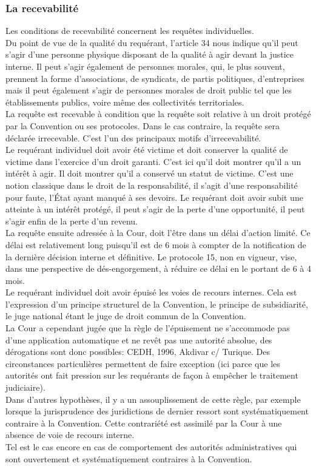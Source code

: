 \documentclass[10pt, a4paper, openany]{book}
\begin{document}
\subsubsection{La recevabilité}

Les conditions de recevabilité concernent les requêtes individuelles. \\
Du point de vue de la qualité du requérant, l'article 34 nous indique qu'il peut s'agir d'une personne physique disposant de la qualité à agir devant la justice interne. Il peut s'agir également de personnes morales, qui, le plus souvent, prennent la forme d'associations, de syndicats, de partis politiques, d'entreprises mais il peut également s'agir de personnes morales de droit public tel que les établissements publics, voire même des collectivités territoriales. \\
La requête est recevable à condition que la requête soit relative à un droit protégé par la Convention ou ses protocoles. Dans le cas contraire, la requête sera déclarée irrecevable. C'est l'un des principaux motifs d'irrecevabilité. \\
Le requérant individuel doit avoir été victime et doit conserver la qualité de victime dans l'exercice d'un droit garanti. C'est ici qu'il doit montrer qu'il a un intérêt à agir. Il doit montrer qu'il a conservé un statut de victime. C'est une notion classique dans le droit de la responsabilité, il s'agit d'une responsabilité pour faute, l'État ayant manqué à ses devoirs. Le requérant doit avoir subit une atteinte à un intérêt protégé, il peut s'agir de la perte d'une opportunité, il peut s'agir enfin de la perte d'un revenu. \\
La requête ensuite adressée à la Cour, doit l'être dans un délai d'action limité. Ce délai est relativement long puisqu'il est de 6 mois à compter de la notification de la dernière décision interne et définitive. Le protocole 15, non en vigueur, vise, dans une perspective de dés-engorgement, à réduire ce délai en le portant de 6 à 4 mois. \\


Le requérant individuel doit avoir épuisé les voies de recours internes. Cela est l'expression d'un principe structurel de la Convention, le principe de subsidiarité, le juge national étant le juge de droit commun de la Convention. \\
La Cour a cependant jugée que la règle de l'épuisement ne s'accommode pas d'une application automatique et ne revêt pas une autorité absolue, des dérogations sont donc possibles: CEDH, 1996, Akdivar c/ Turique. Des circonstances particulières permettent de faire exception (ici parce que les autorités ont fait pression sur les requérants de façon à empêcher le traitement judiciaire).\\
Dans d'autres hypothèses, il y a un assouplissement de cette règle, par exemple lorsque la jurisprudence des juridictions de dernier ressort sont systématiquement contraire à la Convention. Cette contrariété est assimilé par la Cour à une absence de voie de recours interne. \\
Tel est le cas encore en cas de comportement des autorités administratives qui sont ouvertement et systématiquement contraires à la Convention. 
\end{document}
